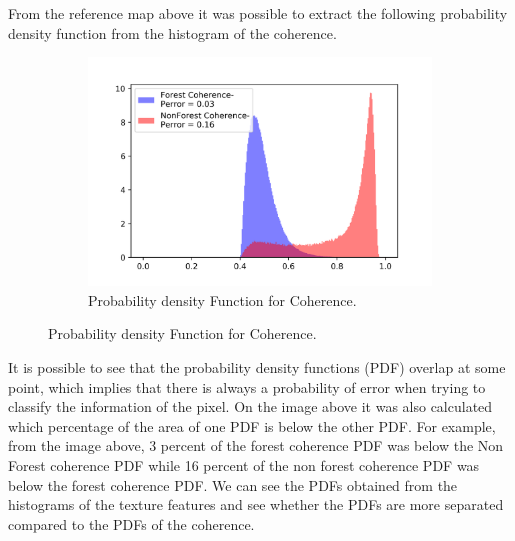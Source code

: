 From the reference map above it was possible to extract the following probability density function from the histogram of the coherence.
\begin{figure}[H]
  \centering
  \begin{subfigure}[b]{\linewidth}
    \includegraphics[width=\linewidth]{Chapter4/histogramcoherence.png}
     \caption{Probability density Function for Coherence.}
  \end{subfigure}
\end{figure}
It is possible to see that the probability density functions (PDF) overlap at some point, which implies that there is always a probability of error when trying to classify the information of the pixel. On the image above it was also calculated which percentage of the area of one PDF is below the other PDF. For example, from the image above, 3 percent of the forest coherence PDF was below the Non Forest coherence PDF while 16 percent of the non forest coherence PDF was below the forest coherence PDF.
We can see the PDFs obtained from the histograms of the texture features and see whether the PDFs are more separated compared to the PDFs of the coherence.

